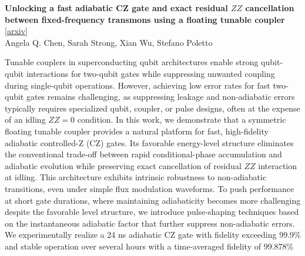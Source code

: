 \documentclass[12pt,letterpaper]{article}
\begin{document}
{\small\textbf{Unlocking a fast adiabatic CZ gate and exact residual $ZZ$ cancellation between fixed-frequency transmons using a floating tunable coupler}} {\scriptsize[\href{https://arxiv.org/abs/2604.05048}{arxiv}]}\nopagebreak\\
{\scriptsize Angela Q. Chen, Sarah Strong, Xian Wu, Stefano Poletto}\nopagebreak\\[2pt]
{\footnotesize Tunable couplers in superconducting qubit architectures enable strong qubit-qubit interactions for two-qubit gates while suppressing unwanted coupling during single-qubit operations. However, achieving low error rates for fast two-qubit gates remains challenging, as suppressing leakage and non-adiabatic errors typically requires specialized qubit, coupler, or pulse designs, often at the expense of an idling $ZZ=0$ condition. In this work, we demonstrate that a symmetric floating tunable coupler provides a natural platform for fast, high-fidelity adiabatic controlled-Z (CZ) gates. Its favorable energy-level structure eliminates the conventional trade-off between rapid conditional-phase accumulation and adiabatic evolution while preserving exact cancellation of residual $ZZ$ interaction at idling. This architecture exhibits intrinsic robustness to non-adiabatic transitions, even under simple flux modulation waveforms. To push performance at short gate durations, where maintaining adiabaticity becomes more challenging despite the favorable level structure, we introduce pulse-shaping techniques based on the instantaneous adiabatic factor that further suppress non-adiabatic errors. We experimentally realize a 24 ns adiabatic CZ gate with fidelity exceeding 99.9\% and stable operation over several hours with a time-averaged fidelity of 99.878\%\par}
\medskip
\end{document}
